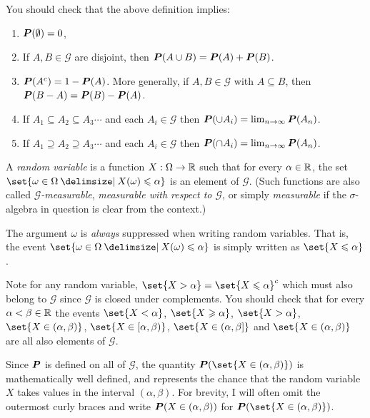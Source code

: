 \begin{remark}
  You should check that the above definition implies:
  \begin{enumerate}
    \item
      $\P(\emptyset) = 0$,
    \item
      If $A, B \in \mathcal G$ are disjoint, then $\P(A \cup B) = \P(A) + \P(B)$.
    \item
      $\P(A^c) = 1 - \P(A)$.
      More generally, if $A, B \in \mathcal G$ with $A \subseteq B$, then $\P(B - A) = \P(B) - \P(A)$.
    \item
      If $A_1 \subseteq A_2 \subseteq A_3 \cdots$ and each $A_i \in \mathcal G$ then $\P(\cup A_i) = \lim_{n \to \infty} \P(A_n)$.
    \item
      If $A_1 \supseteq A_2 \supseteq A_3 \cdots$ and each $A_i \in \mathcal G$ then $\P(\cap A_i) = \lim_{n \to \infty} \P(A_n)$.
  \end{enumerate}
\end{remark}

\begin{definition}
  A \emph{random variable} is a function $X:\Omega \to \R$ such that for every $\alpha \in \R$, the set $\set{ \omega \in \Omega \st X(\omega) \leq \alpha }$ is an element of $\mathcal G$.
  (Such functions are also called \emph{$\mathcal G$-measurable}, \emph{measurable with respect to $\mathcal G$}, or simply \emph{measurable} if the $\sigma$-algebra in question is clear from the context.)
\end{definition}
\begin{remark}
  The argument $\omega$ is \emph{always} suppressed when writing random variables.
  That is, the event $\set{\omega \in \Omega \st X(\omega) \leq \alpha}$ is simply written as $\set{X \leq \alpha}$.
\end{remark}
\begin{remark}
  Note for any random variable, $\set{X > \alpha} = \set{X \leq \alpha}^c$ which must also belong to $\mathcal G$ since $\mathcal G$ is closed under complements.
  You should check that for every $\alpha < \beta \in \R$ the events $\set{X < \alpha}$, $\set{X \geq \alpha}$, $\set{X > \alpha}$, $\set{X \in (\alpha, \beta)}$, $\set{X \in [\alpha, \beta)}$, $\set{X \in (\alpha, \beta]}$ and $\set{X \in (\alpha, \beta)}$ are all also elements of $\mathcal G$.

  Since $\P$ is defined on all of $\mathcal G$, the quantity $\P( \set{X \in (\alpha, \beta)})$ is mathematically well defined, and represents the chance that the random variable $X$ takes values in the interval $(\alpha, \beta)$.
  For brevity, I will often omit the outermost curly braces and write $\P(X \in (\alpha, \beta))$ for $\P(\set{X \in (\alpha, \beta)})$.
\end{remark}

